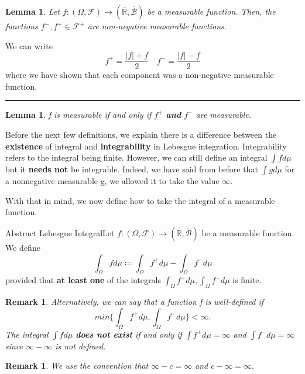 \documentclass[twoside]{article}
\newtheorem{lemma}[theorem]{Lemma}
\newtheorem{remark}[theorem]{Remark}
\newenvironment{proof}{{\bf Proof:}}{\hfill\rule{2mm}{2mm}}
\newcommand{\sigmalgebra}{\mathcal{F}}
\newcommand{\borelsigmaalgebra}{\mathcal{B}}
\begin{document}
\begin{lemma}Let $f:(\Omega, \sigmalgebra) \rightarrow (\overline{\mathbb{R}}, \overline{\borelsigmaalgebra})$ be a measurable function. Then, the functions $f^-, f^+ \in \mathcal{F}^+$ are non-negative measurable functions.
\end{lemma}

\begin{proof} We can write 
$$
f^+ = \frac{|f| + f}{2} \quad f^- = \frac{|f| - f}{2}
$$
where we have shown that each component was a non-negative measurable function.
\end{proof}

\begin{lemma}f is measurable if and only if $f^+$ \textbf{and} $f^-$ are measurable.
\end{lemma}


Before the next few definitions, we explain there is a difference between the \textbf{existence} of integral and \textbf{integrability} in Lebesgue integration. Integrability refers to the integral being finite. However, we can still define an integral $\int fd\mu$ but it \textbf{needs not} be integrable. Indeed, we have said from before that $\int gd\mu$ for a nonnegative measurable g, we allowed it to take the value $\infty.$ 

With that in mind, we now define how to take the integral of a measurable function.

\begin{definition_exam}{Abstract Lebesgue Integral}{}Let $f: (\Omega, \mathcal{F}) \rightarrow (\overline{\mathbb{R}}, \overline{\borelsigmaalgebra})$ be a measurable function. We define 
$$
\int_{\Omega}fd\mu \coloneqq \int_{\Omega}f^+d\mu - \int_{\Omega}f^-d\mu
$$
provided that \textbf{at least one} of the integrals $\int_{\Omega}f^+d\mu, \int_{\Omega}f^-d\mu$ is finite.
\end{definition_exam}

\begin{remark}Alternatively, we can say that a function f is well-defined if $$min\{\int_{\Omega}f^+d\mu, \int_{\Omega}f^-d\mu\} < \infty.$$ The integral $\int fd\mu$ \textbf{does not exist} if and only if $\int f^+d\mu = \infty$ and $\int f^-d\mu = \infty$ since $\infty - \infty$ is not defined.
\end{remark}

\begin{remark}We use the convention that $\infty - c = \infty$ and $c - \infty = \infty.$
\end{remark}
\end{document}
